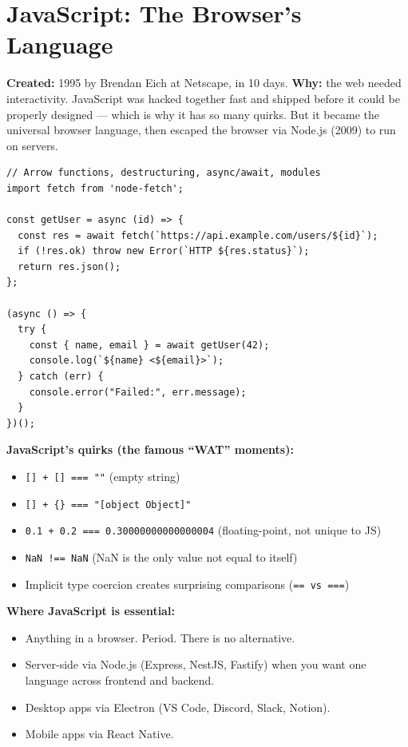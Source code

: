 \documentclass[11pt, letterpaper]{article}
\begin{document}
\section*{JavaScript: The Browser's Language}

\textbf{Created:} 1995 by Brendan Eich at Netscape, in 10 days. \textbf{Why:} the web needed interactivity. JavaScript was hacked together fast and shipped before it could be properly designed --- which is why it has so many quirks. But it became the universal browser language, then escaped the browser via Node.js (2009) to run on servers.

\begin{lstlisting}[style=code, caption={Modern JavaScript}]
// Arrow functions, destructuring, async/await, modules
import fetch from 'node-fetch';

const getUser = async (id) => {
  const res = await fetch(`https://api.example.com/users/${id}`);
  if (!res.ok) throw new Error(`HTTP ${res.status}`);
  return res.json();
};

(async () => {
  try {
    const { name, email } = await getUser(42);
    console.log(`${name} <${email}>`);
  } catch (err) {
    console.error("Failed:", err.message);
  }
})();
\end{lstlisting}

\textbf{JavaScript's quirks (the famous ``WAT'' moments):}
\begin{itemize}[noitemsep]
  \item \texttt{[] + [] === ""} (empty string)
  \item \texttt{[] + \{\} === "[object Object]"}
  \item \texttt{0.1 + 0.2 === 0.30000000000000004} (floating-point, not unique to JS)
  \item \texttt{NaN !== NaN} (NaN is the only value not equal to itself)
  \item Implicit type coercion creates surprising comparisons (\texttt{== vs ===})
\end{itemize}

\textbf{Where JavaScript is essential:}
\begin{itemize}[noitemsep]
  \item Anything in a browser. Period. There is no alternative.
  \item Server-side via Node.js (Express, NestJS, Fastify) when you want one language across frontend and backend.
  \item Desktop apps via Electron (VS Code, Discord, Slack, Notion).
  \item Mobile apps via React Native.
\end{itemize}
\end{document}
